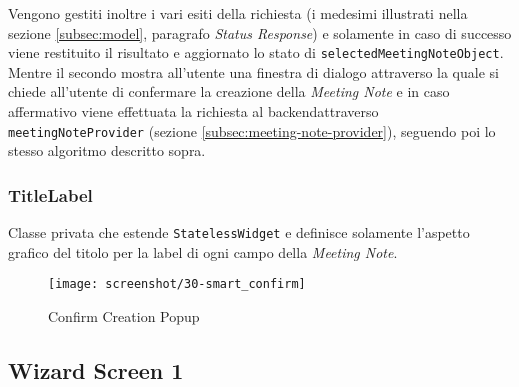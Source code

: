 Vengono gestiti inoltre i vari esiti della richiesta (i medesimi illustrati nella sezione \ref{subsec:model},  paragrafo \emph{Status Response}) e solamente in caso di successo viene restituito il risultato e aggiornato lo stato di \lstinline{selectedMeetingNoteObject}. \\
Mentre il secondo mostra all'utente una finestra di dialogo attraverso la quale si chiede all'utente di confermare la creazione della \emph{Meeting Note} e in caso affermativo viene effettuata la richiesta al \gls{backend}\glsoccur attraverso \lstinline{meetingNoteProvider} (sezione \ref{subsec:meeting-note-provider}), seguendo poi lo stesso algoritmo descritto sopra.

\subsubsection*{TitleLabel}
\label{subsubsec:title-label}

Classe privata che estende \lstinline{StatelessWidget} e definisce solamente l'aspetto grafico del titolo per la label di ogni campo della \emph{Meeting Note}.

\begin{figure}[!h] 
    \centering 
    \texttt{[image: screenshot/30-smart\_confirm]} 
    \caption{Confirm Creation Popup}
    \label{fig:smart-popup}
\end{figure}

\subsection{Wizard Screen 1}
\label{subsec:wizard-screen-1}

